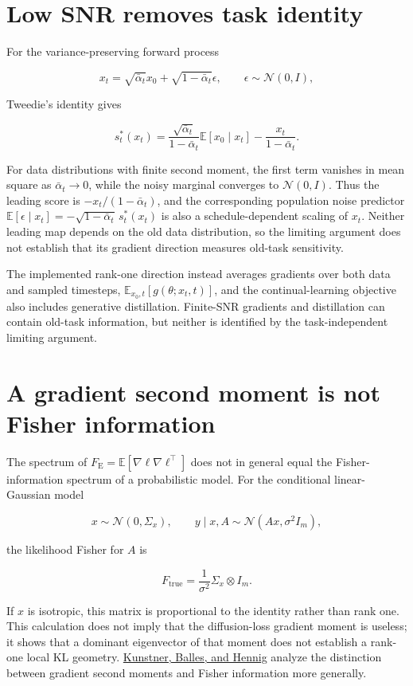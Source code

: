 \documentclass[11pt]{article}
\begin{document}
\section{Low SNR removes task identity}\label{low-snr-removes-task-identity}

For the variance-preserving forward process

\[
x_t=\sqrt{\bar\alpha_t}x_0+\sqrt{1-\bar\alpha_t}\epsilon,
\qquad \epsilon\sim\mathcal N(0,I),
\]

Tweedie's identity gives

\[
s_t^*(x_t)
=\frac{\sqrt{\bar\alpha_t}}{1-\bar\alpha_t}
\mathbb E[x_0\mid x_t]
-\frac{x_t}{1-\bar\alpha_t}.
\]

For data distributions with finite second moment, the first term vanishes in mean square as \(\bar\alpha_t\to0\), while the noisy marginal converges to \(\mathcal N(0,I)\). Thus the leading score is \(-x_t/(1-\bar\alpha_t)\), and the corresponding population noise predictor \(\mathbb E[\epsilon\mid x_t]=-\sqrt{1-\bar\alpha_t}\,s_t^*(x_t)\) is also a schedule-dependent scaling of \(x_t\). Neither leading map depends on the old data distribution, so the limiting argument does not establish that its gradient direction measures old-task sensitivity.

The implemented rank-one direction instead averages gradients over both data and sampled timesteps, \(\mathbb E_{x_0,t}[g(\theta;x_t,t)]\), and the continual-learning objective also includes generative distillation. Finite-SNR gradients and distillation can contain old-task information, but neither is identified by the task-independent limiting argument.

\section{A gradient second moment is not Fisher information}\label{gradient-moment-not-fisher}

The spectrum of \(F_{\mathrm E}=\mathbb E[\nabla\ell\nabla\ell^\top]\) does not in general equal the Fisher-information spectrum of a probabilistic model. For the conditional linear-Gaussian model

\[
x\sim\mathcal N(0,\Sigma_x),
\qquad
y\mid x,A\sim\mathcal N(Ax,\sigma^2I_m),
\]

the likelihood Fisher for \(A\) is

\[
F_{\mathrm{true}}=\frac{1}{\sigma^2}\Sigma_x\otimes I_m.
\]

If \(x\) is isotropic, this matrix is proportional to the identity rather than rank one. This calculation does not imply that the diffusion-loss gradient moment is useless; it shows that a dominant eigenvector of that moment does not establish a rank-one local KL geometry. \href{https://arxiv.org/abs/1905.12558}{Kunstner, Balles, and Hennig} analyze the distinction between gradient second moments and Fisher information more generally.
\end{document}
